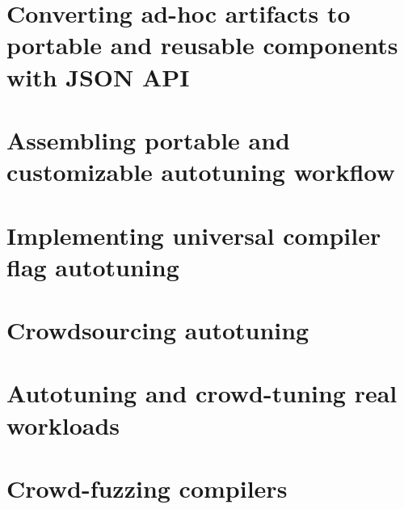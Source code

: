 \documentclass[10pt,letterpaper,twocolumn]{article}
\begin{document}
\section{Converting ad-hoc artifacts to portable and reusable components with JSON API}
\label{sec:converting}


\section{Assembling portable and customizable autotuning workflow}
\label{sec:autotuning}


\section{Implementing universal compiler flag autotuning}
\label{sec:flag_autotuning}


\section{Crowdsourcing autotuning}
\label{sec:crowdtuning}


\section{Autotuning and crowd-tuning real workloads}
\label{sec:collaborative}


\section{Crowd-fuzzing compilers}
\label{sec:crowdfuzzing}

\end{document}

